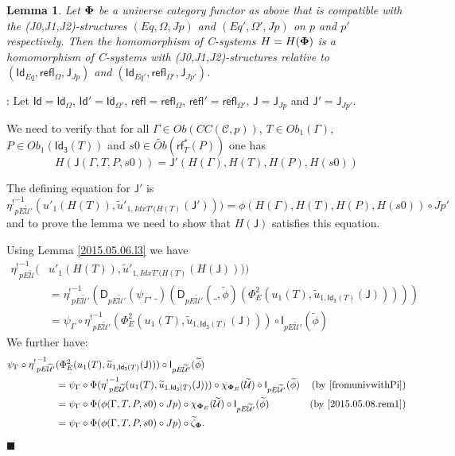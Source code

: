\documentclass[12pt]{article}
\numberwithin{equation}{section}
\newenvironment{eq}{\begin{equation}}{\end{equation}}
\newenvironment{myproof}{{\bf Proof}:}{$\blacksquare$ \vskip 5mm }
\newtheorem{lemma}[proposition]{Lemma}
\newcommand{\by}[1]{\text{(by #1)}}
\newcommand{\wt}{\widetilde}
\newcommand{\toCC}{CC} %
\newcommand{\C}{{\mathcal C}}  %
\newcommand{\Id}{\mathsf{Id}} %
\newcommand{\Idx}{\mathsf{Id_3}} %
\newcommand{\refl}{\mathsf{refl}}
\newcommand{\J}{\mathsf{J}}
\newcommand{\U}{\mathcal{U}}
\newcommand{\D}{\mathsf{D}}
\newcommand{\I}{\mathsf{I}}
\newcommand{\rf}{\mathsf{rf}}
\newcommand{\etashriek}{\eta^!}
\newcommand{\etaunshriek}{{\etashriek}^{-1}}
\newcommand{\Obwt}{\wt{Ob}}
\begin{document}
\begin{lemma}
\label{2015.04.12.l3} Let ${\bf\Phi}$ be a universe category functor as above
that is compatible with the (J0,J1,J2)-structures $(Eq,\Omega,Jp)$ and
$(Eq',\Omega',Jp)$ on $p$ and $p'$ respectively. Then the homomorphism of
C-systems $H=H({\bf\Phi})$ is a homomorphism of C-systems with
(J0,J1,J2)-structures relative to $(\Id_{Eq},\refl_{\Omega},\J_{Jp})$ and
$(\Id_{Eq'},\refl_{\Omega'},\J_{Jp'})$.
\end{lemma}
%
\begin{myproof}
Let $\Id=\Id_{\Omega}$, $\Id'=\Id_{\Omega'}$, $\refl=\refl_{\Omega}$,
$\refl'=\refl_{\Omega'}$, $\J=\J_{Jp}$ and $\J'=\J_{Jp'}$.

We need to verify that for all $\Gamma\in Ob(\toCC({\C},p))$, $T\in
Ob_1(\Gamma)$, $P\in Ob_1(\Idx(T))$ and $s0\in \Obwt(\rf^*_T(P))$ one has
%
$$H(\J(\Gamma,T,P,s0))=\J'(H(\Gamma),H(T),H(P),H(s0))$$
%

The defining equation for $\J'$ is
%
\begin{eq}
  \label{def-eqn-J'}
  \etaunshriek_{pE\wt{\U}'}(u'_1(H(T)),\wt{u}'_{1,{IdxT'(H(T)}}(\J')))=\phi(H(\Gamma),H(T),H(P),H(s0)) \circ Jp' 
\end{eq}
and to prove the lemma we need to show that $H(\J)$ satisfies this equation.

Using Lemma \ref{2015.05.06.l3} we have
%
\begin{align*}
  \etaunshriek_{pE\wt{\U}}(&u'_1(H(T)),\wt{u}'_{1,{IdxT'(H(T)}}(H(\J)))) \\
    & = \etaunshriek_{pE\wt{\U}'}(\D_{pE\wt{\U}'}(\psi_{\Gamma},\_)(\D_{pE\wt{\U}'}(\_,\wt{\phi})(\Phi_E^2(u_1(T),\wt{u}_{1,\Idx(T)}(\J))))) \\
    & = \psi_{\Gamma}\circ \etaunshriek_{pE\wt{\U}'}(\Phi_E^2(u_1(T),\wt{u}_{1,\Idx(T)}(\J)))\circ \I_{pE\wt{\U}'}(\wt{\phi})
\end{align*}
%
We further have:
%
\begin{align*}
  \psi_{\Gamma}\circ \etaunshriek_{pE\wt{\U}'}&(\Phi_E^2(u_1(T),\wt{u}_{1,\Idx(T)}(\J)))\circ \I_{pE\wt{\U}'}(\wt{\phi}) \\
    & = \psi_{\Gamma}\circ \Phi(\etaunshriek_{pE\wt{\U}}(u_1(T),\wt{u}_{1,\Idx(T)}(\J)))\circ \chi_{{\bf\Phi}_E}(\wt{\U})\circ \I_{pE\wt{\U}'}(\wt{\phi}) & \by{\cite[Lemma 5.8]{fromunivwithPi}} \\
    & = \psi_{\Gamma}\circ \Phi(\phi(\Gamma,T,P,s0)\circ Jp)\circ \chi_{{\bf\Phi}_E}(\wt{\U})\circ \I_{pE\wt{\U}'}(\wt{\phi}) & \by{\ref{2015.05.08.rem1}} \\
    & = \psi_{\Gamma}\circ \Phi(\phi(\Gamma,T,P,s0)\circ Jp)\circ \wt{\zeta}_{\bf\Phi}.
\end{align*}
%


\end{myproof}
\end{document}
